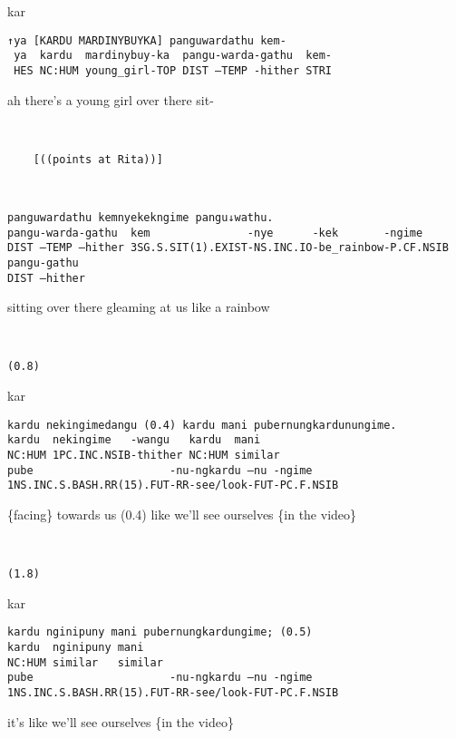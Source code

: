 \documentclass[output=paper,nonflat,colorlinks,citecolor=brown]{langsci/langscibook}
\begin{document}
\vspace{2mm}
%
\begin{transbox}{1}{kar}
\begin{verbatim}
↑ya [KARDU MARDINYBUYKA] panguwardathu kem-
 ya  kardu  mardinybuy-ka  pangu-warda-gathu  kem-
 HES NC:HUM young_girl-TOP DIST –TEMP -hither STRI
\end{verbatim}
\hspace{0.07cm} ah there’s a young girl over there sit-
\end{transbox}
%
\begin{transbox}{2}{~}
\begin{verbatim}
    [((points at Rita))]
\end{verbatim}
\end{transbox}
%
\begin{transbox}{3}{~}
\begin{verbatim}
panguwardathu kemnyekekngime pangu↓wathu.
pangu-warda-gathu  kem               -nye      -kek       -ngime
DIST –TEMP –hither 3SG.S.SIT(1).EXIST-NS.INC.IO-be_rainbow-P.CF.NSIB
pangu-gathu
DIST –hither
\end{verbatim}
sitting over there gleaming at us like a rainbow
\end{transbox}
%
\begin{transbox}{4}{~}
\begin{verbatim}
(0.8)
\end{verbatim}
\end{transbox}
%
\begin{transbox}{5}{kar}
\begin{verbatim}
kardu nekingimedangu (0.4) kardu mani pubernungkardunungime.
kardu  nekingime   -wangu   kardu  mani
NC:HUM 1PC.INC.NSIB-thither NC:HUM similar
pube                     -nu-ngkardu –nu -ngime
1NS.INC.S.BASH.RR(15).FUT-RR-see/look-FUT-PC.F.NSIB
\end{verbatim}
\{facing\} towards us (0.4) like we'll see ourselves \{in the video\}
\end{transbox}
%
\begin{transbox}{6}{~}
\begin{verbatim}
(1.8)
\end{verbatim}
\end{transbox}
%
\begin{transbox}{7}{kar}
\begin{verbatim}
kardu nginipuny mani pubernungkardungime; (0.5)
kardu  nginipuny mani
NC:HUM similar   similar
pube                     -nu-ngkardu –nu -ngime
1NS.INC.S.BASH.RR(15).FUT-RR-see/look-FUT-PC.F.NSIB
\end{verbatim}
it’s like we'll see ourselves \{in the video\}
\end{transbox}
\end{document}
